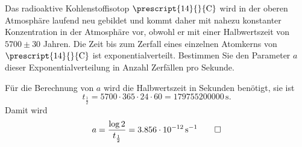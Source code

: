 Das radioaktive Kohlenstoffisotop $\prescript{14}{}{\text{C}}$ wird in der
oberen Atmosphäre laufend neu gebildet und kommt daher mit nahezu
konstanter Konzentration in der Atmosphäre vor, obwohl er mit einer
Halbwertszeit von $5700\pm 30$ Jahren.
Die Zeit bis zum Zerfall eines einzelnen Atomkerns von
$\prescript{14}{}{\text{C}}$ 
ist exponentialverteilt. 
Bestimmen Sie den Parameter $a$ dieser Exponentialverteilung in
Anzahl Zerfällen pro Sekunde.

\begin{loesung}
Für die Berechnung von $a$ wird die Halbwertszeit in Sekunden benötigt,
sie ist
\[
t_{\frac12}
=
5700 \cdot 365 \cdot 24 \cdot 60
=
179755200000\,\text{s}.
\]
Damit wird
\[
a
=
\frac{\log 2}{t_{\frac12}}
=
3.856 \cdot 10^{-12}\,\text{s}^{-1}
\qedhere
\]
\end{loesung}


